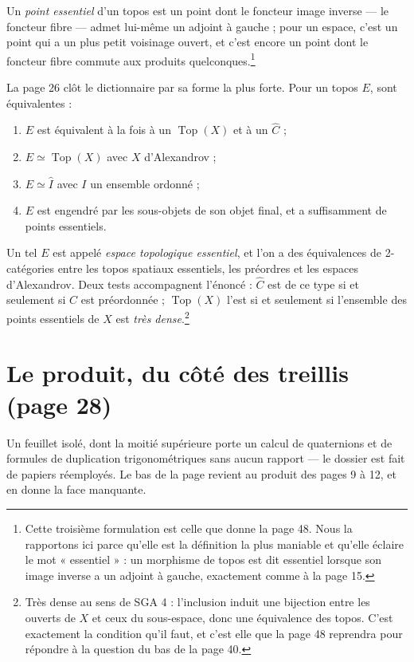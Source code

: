 \documentclass[11pt,a4paper]{article}
\begin{document}
Un \emph{point essentiel} d'un topos est un point dont le foncteur image
inverse — le foncteur fibre — admet lui-même un adjoint à gauche ; pour un
espace, c'est un point qui a un plus petit voisinage ouvert, et c'est encore un
point dont le foncteur fibre commute aux produits quelconques.\footnote{Cette
troisième formulation est celle que donne la page 48. Nous
la rapportons ici parce qu'elle est la définition la plus maniable et qu'elle
éclaire le mot « essentiel » : un morphisme de topos est dit essentiel lorsque
son image inverse a un adjoint à gauche, exactement comme à la page 15.}

La page 26 clôt le dictionnaire par sa forme la plus forte. Pour un topos $E$,
sont équivalentes :

\begin{enumerate}
\item[$\alpha$)] $E$ est équivalent à la fois à un $\operatorname{Top}(X)$ et à
un $\widehat{C}$ ;
\item[$\beta$)] $E \simeq \operatorname{Top}(X)$ avec $X$ d'Alexandrov ;
\item[$\gamma$)] $E \simeq \widehat{I}$ avec $I$ un ensemble ordonné ;
\item[$\delta$)] $E$ est engendré par les sous-objets de son objet final, et a
suffisamment de points essentiels.
\end{enumerate}

Un tel $E$ est appelé \emph{espace topologique essentiel}, et l'on a des
équivalences de 2-catégories entre les topos spatiaux essentiels, les
préordres et les espaces d'Alexandrov. Deux tests accompagnent l'énoncé :
$\widehat{C}$ est de ce type si et seulement si $C$ est préordonnée ;
$\operatorname{Top}(X)$ l'est si et seulement si l'ensemble des points
essentiels de $X$ est \emph{très dense}.\footnote{Très dense au sens de
SGA 4 : l'inclusion induit une bijection entre les ouverts de $X$ et ceux du
sous-espace, donc une équivalence des topos. C'est exactement la condition
qu'il faut, et c'est elle que la page 48 reprendra pour répondre à la
question du bas de la page 40.}

\section*{Le produit, du côté des treillis (page 28)}

Un feuillet isolé, dont la moitié supérieure porte un calcul de quaternions et
de formules de duplication trigonométriques sans aucun rapport — le dossier est
fait de papiers réemployés. Le bas de la page revient au produit des pages 9 à
12, et en donne la face manquante.
\end{document}
